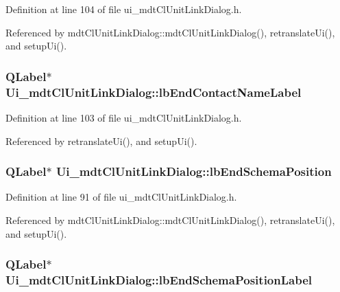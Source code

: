 Definition at line 104 of file ui\-\_\-mdt\-Cl\-Unit\-Link\-Dialog.\-h.



Referenced by mdt\-Cl\-Unit\-Link\-Dialog\-::mdt\-Cl\-Unit\-Link\-Dialog(), retranslate\-Ui(), and setup\-Ui().

\hypertarget{class_ui__mdt_cl_unit_link_dialog_ae6cabdba3d4f552beb2aa8c8690ef2b5}{
\subsubsection[{lb\-End\-Contact\-Name\-Label}]{\setlength{\rightskip}{0pt plus 5cm}Q\-Label$\ast$ Ui\-\_\-mdt\-Cl\-Unit\-Link\-Dialog\-::lb\-End\-Contact\-Name\-Label}}\label{class_ui__mdt_cl_unit_link_dialog_ae6cabdba3d4f552beb2aa8c8690ef2b5}


Definition at line 103 of file ui\-\_\-mdt\-Cl\-Unit\-Link\-Dialog.\-h.



Referenced by retranslate\-Ui(), and setup\-Ui().

\hypertarget{class_ui__mdt_cl_unit_link_dialog_ab5c0df8c3acbb95824f42463c3c6a1fb}{
\subsubsection[{lb\-End\-Schema\-Position}]{\setlength{\rightskip}{0pt plus 5cm}Q\-Label$\ast$ Ui\-\_\-mdt\-Cl\-Unit\-Link\-Dialog\-::lb\-End\-Schema\-Position}}\label{class_ui__mdt_cl_unit_link_dialog_ab5c0df8c3acbb95824f42463c3c6a1fb}


Definition at line 91 of file ui\-\_\-mdt\-Cl\-Unit\-Link\-Dialog.\-h.



Referenced by mdt\-Cl\-Unit\-Link\-Dialog\-::mdt\-Cl\-Unit\-Link\-Dialog(), retranslate\-Ui(), and setup\-Ui().

\hypertarget{class_ui__mdt_cl_unit_link_dialog_a3c5c9794fa6c0ecdc61860ed39525f81}{
\subsubsection[{lb\-End\-Schema\-Position\-Label}]{\setlength{\rightskip}{0pt plus 5cm}Q\-Label$\ast$ Ui\-\_\-mdt\-Cl\-Unit\-Link\-Dialog\-::lb\-End\-Schema\-Position\-Label}}\label{class_ui__mdt_cl_unit_link_dialog_a3c5c9794fa6c0ecdc61860ed39525f81}


